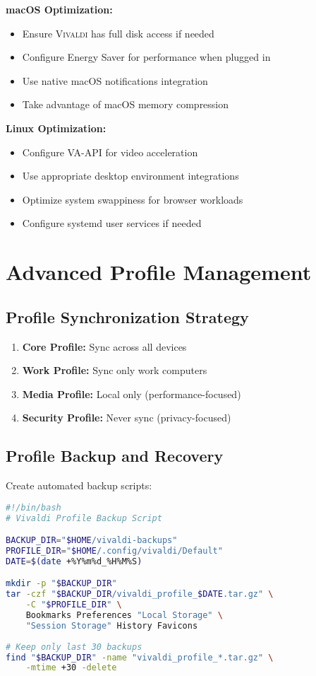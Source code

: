 \documentclass[11pt,a4paper,oneside]{book}
\newcommand{\vivaldi}{\textsc{Vivaldi}}
\begin{document}
\textbf{macOS Optimization:}
\begin{itemize}
    \item Ensure \vivaldi{} has full disk access if needed
    \item Configure Energy Saver for performance when plugged in
    \item Use native macOS notifications integration
    \item Take advantage of macOS memory compression
\end{itemize}

\textbf{Linux Optimization:}
\begin{itemize}
    \item Configure VA-API for video acceleration
    \item Use appropriate desktop environment integrations
    \item Optimize system swappiness for browser workloads
    \item Configure systemd user services if needed
\end{itemize}

\section{Advanced Profile Management}

\subsection{Profile Synchronization Strategy}

\begin{enumerate}
    \item \textbf{Core Profile:} Sync across all devices
    \item \textbf{Work Profile:} Sync only work computers
    \item \textbf{Media Profile:} Local only (performance-focused)
    \item \textbf{Security Profile:} Never sync (privacy-focused)
\end{enumerate}

\subsection{Profile Backup and Recovery}

Create automated backup scripts:

\begin{codebox}
\begin{lstlisting}[language=bash]
#!/bin/bash
# Vivaldi Profile Backup Script

BACKUP_DIR="$HOME/vivaldi-backups"
PROFILE_DIR="$HOME/.config/vivaldi/Default"
DATE=$(date +%Y%m%d_%H%M%S)

mkdir -p "$BACKUP_DIR"
tar -czf "$BACKUP_DIR/vivaldi_profile_$DATE.tar.gz" \
    -C "$PROFILE_DIR" \
    Bookmarks Preferences "Local Storage" \
    "Session Storage" History Favicons
    
# Keep only last 30 backups
find "$BACKUP_DIR" -name "vivaldi_profile_*.tar.gz" \
    -mtime +30 -delete
\end{lstlisting}
\end{codebox}
\end{document}
